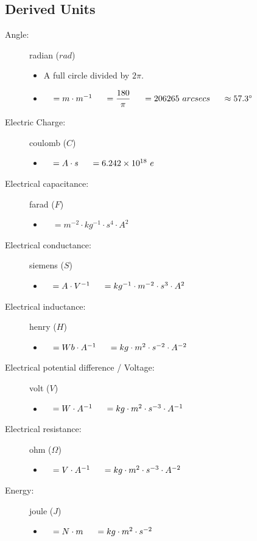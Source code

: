 \documentclass[]{report}
\newcommand \tab[1][1cm]{\hspace*{#1}}
\newcommand{\items}{\item\ \ }
\newcommand{\degrees}{^{\circ}}
\begin{document}
\subsection{Derived Units}
\begin{description}				

\item[Angle:] radian ($rad$)
\begin{itemize}
\item A full circle divided by $2\pi.$
\items $= m\cdot m^{-1} \tab[0.5cm]= \dfrac{180}{\pi} \tab[0.5cm]= 206265\ arcsecs \tab[0.5cm]\approx 57.3 \degrees$                    
\end{itemize}				

\item[Electric Charge:] coulomb ($C$)
\begin{itemize}
\items $= A\cdot s \tab[0.5cm]= 6.242\times 10^{18}\ e$
\end{itemize}	

\item[Electrical capacitance:] farad ($F$)
\begin{itemize}
\items $=  m^{-2} \cdot kg^{-1} \cdot  s^4 \cdot A^2$
\end{itemize}				

\item[Electrical conductance:] siemens ($S$)
\begin{itemize}
\items $= A \cdot V^{-1} \tab[0.5cm]= kg^{-1} \cdot m^{-2} \cdot s^3 \cdot A^2$
\end{itemize}

\item[Electrical inductance:] henry ($H$)
\begin{itemize}
\items $= Wb\cdot A^{-1}\tab[0.5cm]= kg \cdot m^2 \cdot s^{-2} \cdot A^{-2}$
\end{itemize}	

\item[Electrical potential difference / Voltage:] volt ($V$)
\begin{itemize}
\items $= W \cdot A^{-1} \tab[0.5cm]= kg \cdot m^{2} \cdot s^{-3} \cdot A^{-1}$
\end{itemize}			

\item[Electrical resistance:] ohm ($\Omega$)
\begin{itemize}
\items $= V\cdot A^{-1} \tab[0.5cm]= kg \cdot m^{2} \cdot s^{-3} \cdot A^{-2}$
\end{itemize}

\item[Energy:] joule ($J$)
\begin{itemize}
\items $= N \cdot m \tab[0.5cm]= kg \cdot m^{2} \cdot s^{-2}$
\end{itemize}


\end{description}
\end{document}
